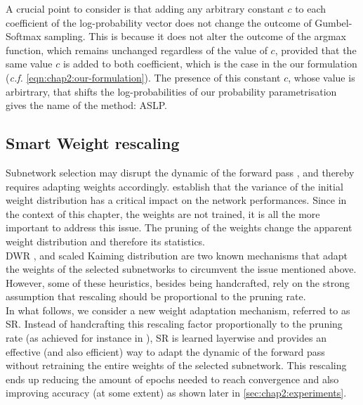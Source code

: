 A crucial point to consider is that adding any arbitrary constant $c$ to each
coefficient of the log-probability vector does not change the outcome of
Gumbel-Softmax sampling. This is because it does not alter the outcome of the
argmax function, which remains unchanged regardless of the value of $c$,
provided that the same value $c$ is added to both coefficient, which is the case
in the our formulation (\emph{c.f.} \cref*{eqn:chap2:our-formulation}). The
presence of this constant $c$, whose value is arbirtrary, that shifts the
log-probabilities of our probability parametrisation gives the name of the
method: \acl{ASLP}.\\ 



\subsection{Smart Weight rescaling}
\label{sec:smart-rescale}
Subnetwork selection may disrupt the dynamic of the forward pass
\cite{DBLP:conf/iccv/HeZRS15,DBLP:conf/cvpr/RamanujanWKFR20}, and thereby
requires adapting  weights accordingly. \cite{DBLP:conf/iccv/HeZRS15} establish
that the variance of the initial weight distribution has a critical impact on
the network performances. Since in the context of this chapter, the weights are
not trained, it is all the more important to address this issue. The pruning of
the weights change the apparent weight distribution and therefore its
statistics.\\

\ac{DWR} \cite{DBLP:conf/nips/ZhouLLY19}, and scaled Kaiming distribution
\cite{DBLP:conf/cvpr/RamanujanWKFR20}  are two known mechanisms that adapt the
weights of the selected subnetworks to circumvent the issue mentioned above.
However, some of these heuristics, besides being handcrafted,   rely on the
strong assumption that rescaling should be proportional to the pruning rate.\\

In what follows,  we consider a new weight adaptation mechanism, referred to as
\ac{SR}. Instead of handcrafting this rescaling factor proportionally
to the pruning rate (as achieved for instance in
\cite{DBLP:conf/nips/ZhouLLY19}), \ac{SR} is learned layerwise and provides an
effective (and also efficient)  way to adapt the dynamic of the forward pass
without retraining the entire weights of the selected subnetwork. This
rescaling ends up reducing the amount of epochs needed to reach convergence and
also improving accuracy (at some extent) as shown later in \cref{sec:chap2:experiments}. \\ 

